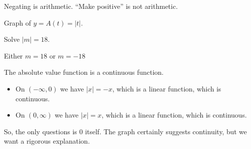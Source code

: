 \documentclass{ximera}
\begin{document}
Negating is arithmetic.
``Make positive'' is not arithmetic.




Graph of $y = A(t) = |t|$.

\begin{image}
\end{image}







\begin{example}

Solve $|m| = 18$.


Either $m = 18$  or $m = -18$

\end{example}







The absolute value function is a continuous function.

\begin{itemize}
\item On $(-\infty, 0)$ we have $| x | = -x$, which is a linear function, which is continuous.
\item On $(0, \infty)$ we have $| x | = x$, which is a linear function, which is continuous.
\end{itemize}

So, the only questions is $0$ itself.  The graph certainly suggests continuity, but we want a rigorous explanation. \\
\end{document}
